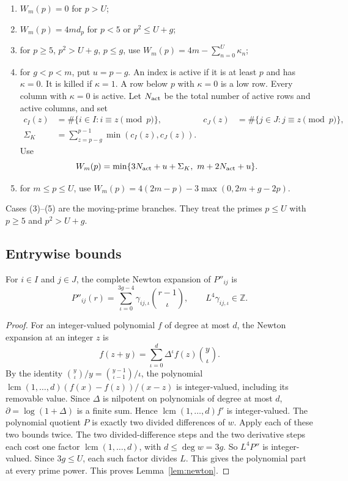\begin{enumerate}
\item
\(W_m(p)=0\) for \(p>U\);
\item
\(W_m(p)=4m d_p\) for \(p<5\) or \(p^2 \le U+g\);
\item
for \(p\ge5\), \(p^2>U+g\), \(p\le{}g\), use \(W_m(p)=4m-\sum_{n=0}^U \kappa_n\);
\item
for \(g<p<m\), put \(u=p-g\). An index is active if it is at least \(p\) and has \(\kappa=0\). It is killed if \(\kappa=1\). A row below \(p\) with \(\kappa=0\) is a low row. Every column with \(\kappa=0\) is active. Let \(N_{\rm act}\) be the total number of active rows and active columns, and set
\[
\begin{aligned}
  c_I(z)&=\#\{i\in I:i\equiv z\pmod p\},&
  c_J(z)&=\#\{j\in J:j\equiv z\pmod p\},\\
  \Sigma_K&=\sum_{z=p-g}^{p-1}\min(c_I(z),c_J(z)).
\end{aligned}
\]
Use
\[
  W_m(p)=\min\{3N_{\rm act}+u+\Sigma_K,\ m+2N_{\rm act}+u\}.
\]
\item
for \(m\le{}p\le{}U\), use \(W_m(p)=4(2m-p)-3 \max(0,2m+g-2p)\).
\end{enumerate}

Cases (3)--(5) are the moving-prime branches. They treat the primes \(p\le U\) with \(p\ge5\) and \(p^2>U+g\).

\subsection{Entrywise bounds}

\begin{lemma}\label{lem:newton}
For \(i\in I\) and \(j\in J\), the complete Newton expansion of \(P''_{ij}\) is
\[
 P''_{ij}(r)=\sum_{\iota=0}^{3g-4}\gamma_{ij,\iota}\binom{r-1}{\iota},
 \qquad L^4\gamma_{ij,\iota}\in{\mathbb Z}.
\]
\end{lemma}

\begin{proof}
For an integer-valued polynomial \(f\) of degree at most \(d\), the Newton expansion at an integer \(z\) is
\[
 f(z+y)=\sum_{\iota=0}^d\Delta^\iota f(z)\binom y\iota .
\]
By the identity \(\binom y\iota/y=\binom{y-1}{\iota-1}/\iota\), the polynomial \(\operatorname {lcm}(1,\ldots,d)(f(x)-f(z))/(x-z)\) is integer-valued, including its removable value. Since \(\Delta\) is nilpotent on polynomials of degree at most \(d\), \(\partial=\log(1+\Delta)\) is a finite sum. Hence \(\operatorname{lcm}(1,\ldots,d)f'\) is integer-valued. The polynomial quotient \(P\) is exactly two divided differences of \(w\). Apply each of these two bounds twice. The two divided-difference steps and the two derivative steps each cost one factor \(\operatorname{lcm}(1,\ldots,d)\), with \(d\le\deg w=3g\). So \(L^4P''\) is integer-valued. Since \(3g\le U\), each such factor divides \(L\). This gives the polynomial part at every prime power. This proves Lemma~\ref{lem:newton}.
\end{proof}

